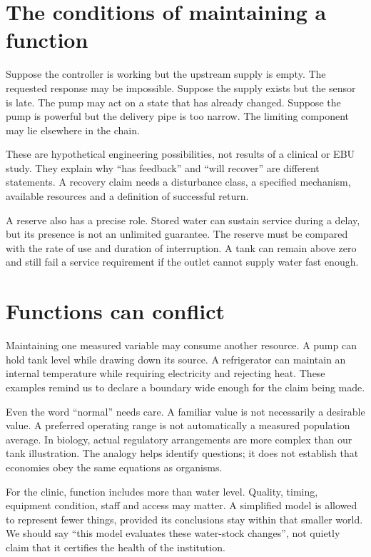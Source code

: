 \section{The conditions of maintaining a function}
Suppose the controller is working but the upstream supply is empty. The requested response may be impossible. Suppose the supply exists but the sensor is late. The pump may act on a state that has already changed. Suppose the pump is powerful but the delivery pipe is too narrow. The limiting component may lie elsewhere in the chain.

These are hypothetical engineering possibilities, not results of a clinical or EBU study. They explain why ``has feedback'' and ``will recover'' are different statements. A recovery claim needs a disturbance class, a specified mechanism, available resources and a definition of successful return.

A reserve also has a precise role. Stored water can sustain service during a delay, but its presence is not an unlimited guarantee. The reserve must be compared with the rate of use and duration of interruption. A tank can remain above zero and still fail a service requirement if the outlet cannot supply water fast enough.

\section{Functions can conflict}
Maintaining one measured variable may consume another resource. A pump can hold tank level while drawing down its source. A refrigerator can maintain an internal temperature while requiring electricity and rejecting heat. These examples remind us to declare a boundary wide enough for the claim being made.

Even the word ``normal'' needs care. A familiar value is not necessarily a desirable value. A preferred operating range is not automatically a measured population average. In biology, actual regulatory arrangements are more complex than our tank illustration. The analogy helps identify questions; it does not establish that economies obey the same equations as organisms.

For the clinic, function includes more than water level. Quality, timing, equipment condition, staff and access may matter. A simplified model is allowed to represent fewer things, provided its conclusions stay within that smaller world. We should say ``this model evaluates these water-stock changes'', not quietly claim that it certifies the health of the institution.

